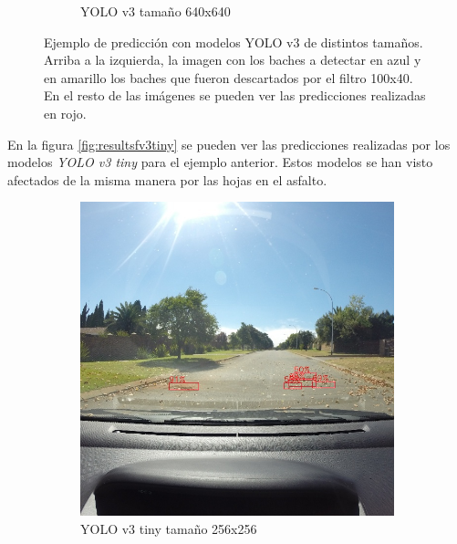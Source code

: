 \begin{figure}[H]
\begin{subfigure}[h]{0.45\linewidth}
		\caption{YOLO v3 tamaño 640x640}
	\end{subfigure}
	\caption{Ejemplo de predicción con modelos YOLO v3 de distintos tamaños. Arriba a la izquierda, la imagen con los baches a detectar en azul y en amarillo los baches que fueron descartados por el filtro 100x40. En el resto de las imágenes se pueden ver las predicciones realizadas en rojo.}
	\label{fig:resultsfv3}
\end{figure}

En la figura \ref{fig:resultsfv3tiny} se pueden ver las predicciones realizadas por los modelos \textit{YOLO v3 tiny} para el ejemplo anterior. Estos modelos se han visto afectados de la misma manera por las hojas en el asfalto.

\begin{figure}[H]
	\centering
	\begin{subfigure}[h]{0.45\linewidth}
		\includegraphics[width=\linewidth]{images/results_f_yolo_v3_tiny_256.jpg}
		\caption{YOLO v3 tiny tamaño 256x256}
	\end{subfigure}
	\begin{subfigure}[h]{0.45\linewidth}

\end{subfigure}
\end{figure}
